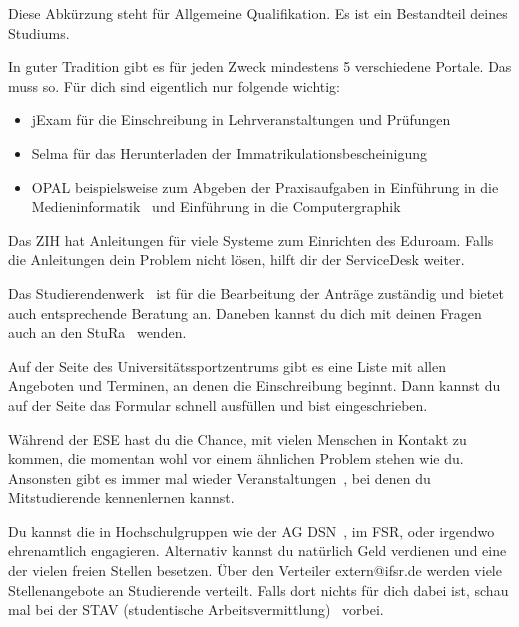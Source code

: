 Diese Abkürzung steht für Allgemeine Qualifikation. Es ist ein Bestandteil deines Studiums.~

In guter Tradition gibt es für jeden Zweck mindestens 5 verschiedene Portale. Das muss so. Für dich sind eigentlich nur folgende wichtig:
\begin{itemize}
\item jExam für die Einschreibung in Lehrveranstaltungen und Prüfungen
\item Selma für das Herunterladen der Immatrikulationsbescheinigung
\item OPAL beispielsweise zum Abgeben der Praxisaufgaben in Einführung in die Medieninformatik~ und Einführung in die Computergraphik~
\end{itemize}

Das ZIH hat Anleitungen für viele Systeme zum Einrichten des Eduroam. Falls die Anleitungen dein Problem nicht lösen, hilft dir der ServiceDesk weiter.

Das Studierendenwerk~ ist für die Bearbeitung der Anträge zuständig und bietet auch entsprechende Beratung an. Daneben kannst du dich mit deinen Fragen auch an den StuRa~ wenden.

Auf der Seite des Universitätssportzentrums gibt es eine Liste mit allen Angeboten und Terminen, an denen die Einschreibung beginnt. Dann kannst du auf der Seite das Formular schnell ausfüllen und bist eingeschrieben.

Während der ESE hast du die Chance, mit vielen Menschen in Kontakt zu kommen, die momentan wohl vor einem ähnlichen Problem stehen wie du.
Ansonsten gibt es immer mal wieder Veranstaltungen~, bei denen du Mitstudierende kennenlernen kannst.

Du kannst die in Hochschulgruppen wie der AG DSN~, im FSR, oder irgendwo ehrenamtlich engagieren. Alternativ kannst du natürlich Geld verdienen und eine der vielen freien Stellen besetzen. Über den Verteiler extern@ifsr.de werden viele Stellenangebote an Studierende verteilt. Falls dort nichts für dich dabei ist, schau mal bei der STAV (studentische Arbeitsvermittlung)~ vorbei.

